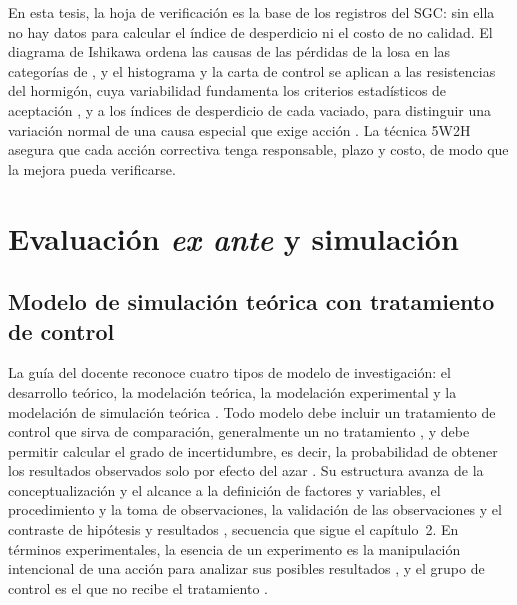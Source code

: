 En esta tesis, la hoja de verificación es la base de los registros del SGC: sin ella no hay datos para calcular el índice de desperdicio ni el costo de no calidad. El diagrama de Ishikawa ordena las causas de las pérdidas de la losa en las categorías de \textcite[pp.~12--13]{luangcharoenrat2019}, y el histograma y la carta de control se aplican a las resistencias del hormigón, cuya variabilidad fundamenta los criterios estadísticos de aceptación \parencite[p.~58]{alcon2009}, y a los índices de desperdicio de cada vaciado, para distinguir una variación normal de una causa especial que exige acción \parencite[p.~27]{cepeda2017}. La técnica 5W2H asegura que cada acción correctiva tenga responsable, plazo y costo, de modo que la mejora pueda verificarse.

\section{Evaluación \emph{ex ante} y simulación}
\label{sec:simulacion-marco}

\subsection{Modelo de simulación teórica con tratamiento de control}

La guía del docente reconoce cuatro tipos de modelo de investigación: el desarrollo teórico, la modelación teórica, la modelación experimental y la modelación de simulación teórica \parencite[diapositiva~4]{barrios2021modelo}. Todo modelo debe incluir un tratamiento de control que sirva de comparación, generalmente un no tratamiento \parencite[diapositiva~8]{barrios2021modelo}, y debe permitir calcular el grado de incertidumbre, es decir, la probabilidad de obtener los resultados observados solo por efecto del azar \parencite[diapositiva~9]{barrios2021modelo}. Su estructura avanza de la conceptualización y el alcance a la definición de factores y variables, el procedimiento y la toma de observaciones, la validación de las observaciones y el contraste de hipótesis y resultados \parencite[diapositiva~12]{barrios2021modelo}, secuencia que sigue el capítulo~2. En términos experimentales, la esencia de un experimento es la manipulación intencional de una acción para analizar sus posibles resultados \parencite[p.~151]{hernandez2018}, y el grupo de control es el que no recibe el tratamiento \parencite[p.~154]{hernandez2018}.

